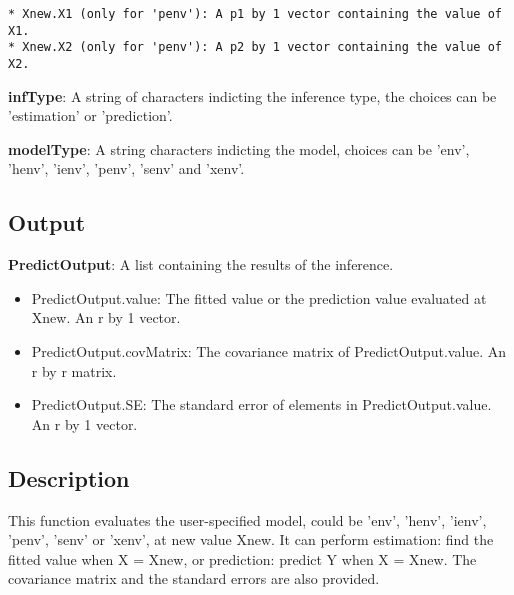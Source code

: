 \documentclass[a4paper,11pt,openany]{memoir}
\begin{document}
\begin{verbatim}* Xnew.X1 (only for 'penv'): A p1 by 1 vector containing the value of X1.
* Xnew.X2 (only for 'penv'): A p2 by 1 vector containing the value of X2.\end{verbatim}
    \begin{par}
\textbf{infType}: A string of characters indicting the inference type, the choices can be 'estimation' or 'prediction'.
\end{par} \vspace{1em}
\begin{par}
\textbf{modelType}: A string characters indicting the model, choices can be 'env', 'henv', 'ienv', 'penv', 'senv' and 'xenv'.
\end{par} \vspace{1em}


\subsection*{Output}

\begin{par}
\textbf{PredictOutput}: A list containing the results of the inference.
\end{par} \vspace{1em}
\begin{itemize}
\setlength{\itemsep}{-1ex}
   \item PredictOutput.value: The fitted value or the prediction value evaluated at Xnew. An r by 1 vector.
   \item PredictOutput.covMatrix: The covariance matrix of PredictOutput.value. An r by r matrix.
   \item PredictOutput.SE: The standard error of elements in PredictOutput.value. An r by 1 vector.
\end{itemize}


\subsection*{Description}

\begin{par}
This function evaluates the user-specified model, could be 'env', 'henv', 'ienv', 'penv', 'senv' or 'xenv', at new value Xnew.  It can perform estimation: find the fitted value when X = Xnew, or prediction: predict Y when X = Xnew.  The covariance matrix and the standard errors are also provided.
\end{par} \vspace{1em}
\end{document}
